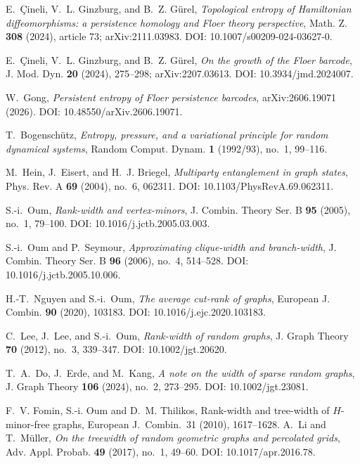  E.~\c{C}ineli, V.~L. Ginzburg, and B.~Z. G\"urel,
\emph{Topological entropy of Hamiltonian diffeomorphisms: a persistence
homology and Floer theory perspective}, Math. Z. \textbf{308} (2024),
article 73; arXiv:2111.03983. DOI: 10.1007/s00209-024-03627-0.

 E.~\c{C}ineli, V.~L. Ginzburg, and B.~Z. G\"urel,
\emph{On the growth of the Floer barcode}, J. Mod. Dyn. \textbf{20} (2024),
275--298; arXiv:2207.03613. DOI: 10.3934/jmd.2024007.

 W.~Gong,
\emph{Persistent entropy of Floer persistence barcodes}, arXiv:2606.19071
(2026). DOI: 10.48550/arXiv.2606.19071.

 T.~Bogensch\"utz,
\emph{Entropy, pressure, and a variational principle for random dynamical
systems}, Random Comput. Dynam. \textbf{1} (1992/93), no.~1, 99--116.

 M.~Hein, J.~Eisert, and H.~J. Briegel,
\emph{Multiparty entanglement in graph states}, Phys. Rev. A \textbf{69}
(2004), no.~6, 062311. DOI: 10.1103/PhysRevA.69.062311.

 S.-i.~Oum, \emph{Rank-width and vertex-minors},
J. Combin. Theory Ser. B \textbf{95} (2005), no.~1, 79--100.
DOI: 10.1016/j.jctb.2005.03.003.

 S.-i.~Oum and P.~Seymour,
\emph{Approximating clique-width and branch-width},
J. Combin. Theory Ser. B \textbf{96} (2006), no.~4, 514--528.
DOI: 10.1016/j.jctb.2005.10.006.

 H.-T.~Nguyen and S.-i.~Oum,
\emph{The average cut-rank of graphs}, European J. Combin. \textbf{90}
(2020), 103183. DOI: 10.1016/j.ejc.2020.103183.

 C.~Lee, J.~Lee, and S.-i.~Oum,
\emph{Rank-width of random graphs}, J. Graph Theory \textbf{70}
(2012), no.~3, 339--347. DOI: 10.1002/jgt.20620.

 T.~A.~Do, J.~Erde, and M.~Kang,
\emph{A note on the width of sparse random graphs},
J. Graph Theory \textbf{106} (2024), no.~2, 273--295.
DOI: 10.1002/jgt.23081.

 F.~V. Fomin, S.-i. Oum and D.~M. Thilikos, Rank-width and tree-width of $H$-minor-free graphs, European J.\ Combin.\ 31 (2010), 1617--1628.
 A.~Li and T.~M\"uller,
\emph{On the treewidth of random geometric graphs and percolated grids},
Adv. Appl. Probab. \textbf{49} (2017), no.~1, 49--60.
DOI: 10.1017/apr.2016.78.

